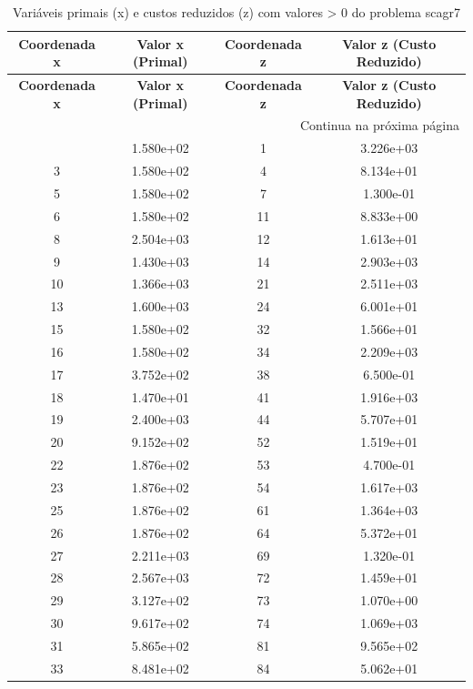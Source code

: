 \documentclass[12pt]{article}
\begin{document}
\begin{longtable}{@{}cccc@{}}
\caption{Variáveis primais (x) e custos reduzidos (z) com valores > 0 do problema scagr7} \\
\toprule
\textbf{Coordenada x} & \textbf{Valor x (Primal)} & \textbf{Coordenada z} & \textbf{Valor z (Custo Reduzido)} \\
\midrule
\endfirsthead

\toprule
\textbf{Coordenada x} & \textbf{Valor x (Primal)} & \textbf{Coordenada z} & \textbf{Valor z (Custo Reduzido)} \\
\midrule
\endhead

\midrule \multicolumn{4}{r}{{Continua na próxima página}} \\ \midrule
\endfoot

\bottomrule
\endlastfoot
2 & 1.580e+02 & 1 & 3.226e+03 \\
3 & 1.580e+02 & 4 & 8.134e+01 \\
5 & 1.580e+02 & 7 & 1.300e-01 \\
6 & 1.580e+02 & 11 & 8.833e+00 \\
8 & 2.504e+03 & 12 & 1.613e+01 \\
9 & 1.430e+03 & 14 & 2.903e+03 \\
10 & 1.366e+03 & 21 & 2.511e+03 \\
13 & 1.600e+03 & 24 & 6.001e+01 \\
15 & 1.580e+02 & 32 & 1.566e+01 \\
16 & 1.580e+02 & 34 & 2.209e+03 \\
17 & 3.752e+02 & 38 & 6.500e-01 \\
18 & 1.470e+01 & 41 & 1.916e+03 \\
19 & 2.400e+03 & 44 & 5.707e+01 \\
20 & 9.152e+02 & 52 & 1.519e+01 \\
22 & 1.876e+02 & 53 & 4.700e-01 \\
23 & 1.876e+02 & 54 & 1.617e+03 \\
25 & 1.876e+02 & 61 & 1.364e+03 \\
26 & 1.876e+02 & 64 & 5.372e+01 \\
27 & 2.211e+03 & 69 & 1.320e-01 \\
28 & 2.567e+03 & 72 & 1.459e+01 \\
29 & 3.127e+02 & 73 & 1.070e+00 \\
30 & 9.617e+02 & 74 & 1.069e+03 \\
31 & 5.865e+02 & 81 & 9.565e+02 \\
33 & 8.481e+02 & 84 & 5.062e+01 \\

\end{longtable}
\end{document}
